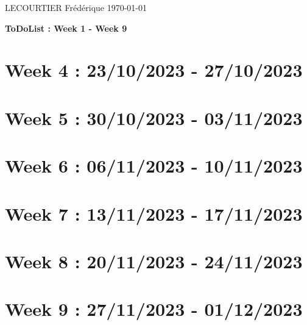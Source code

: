 \documentclass{article}
\begin{document}
	LECOURTIER Frédérique \hfill \today
	\begin{center}
		\Large\textbf{{ToDoList : Week 1 - Week 9}}
	\end{center}
	\tableofcontents

	\newpage

	\section*{Week 4 : 23/10/2023 - 27/10/2023}
	

	\newpage

	\section*{Week 5 : 30/10/2023 - 03/11/2023}
	

	\newpage

	\section*{Week 6 : 06/11/2023 - 10/11/2023}
	

	\newpage

	\section*{Week 7 : 13/11/2023 - 17/11/2023}
	

	\newpage

	\section*{Week 8 : 20/11/2023 - 24/11/2023}
	

	\newpage

	\section*{Week 9 : 27/11/2023 - 01/12/2023}
	
\end{document}

